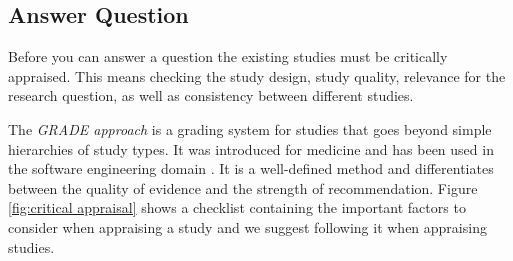
\subsection{Answer Question}
\label{subsec:answer question}

Before you can answer a question the existing studies must be critically appraised. This means checking the study design, study quality, relevance for the research question, as well as consistency between different studies. 

The \emph{GRADE approach} \cite{Atkins2004} is a grading system for studies that goes beyond simple hierarchies of study types. It was introduced for medicine and has been used in the software engineering domain \cite{Wohlin2013EvidenceProfile,Dyba2008}. It is a well-defined method and differentiates between the quality of evidence and the strength of recommendation. Figure \ref{fig:critical appraisal} shows a checklist containing the important factors to consider when appraising a study and we suggest following it when appraising studies.

